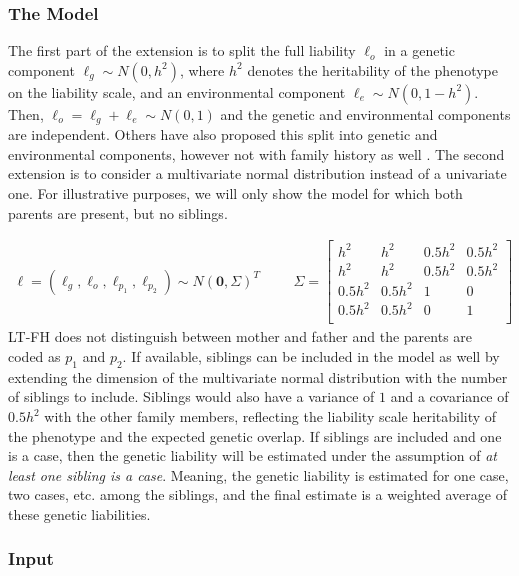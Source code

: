 \subsubsection{The Model}

The first part of the extension is to split the full liability $ \ell_o $ in a genetic component $ \ell_g \sim N(0,h^2) $, where $ h^2 $ denotes the heritability of the phenotype on the liability scale, and an environmental component $ \ell_e \sim N(0, 1-h^2) $. Then, $ \ell_o = \ell_g + \ell_e \sim N(0,1) $ and the genetic and environmental components are independent. Others have also proposed this split into genetic and environmental components, however not with family history as well \cite{weissbrod2015accurate}. The second extension is to consider a multivariate normal distribution instead of a univariate one. For illustrative purposes, we will only show the model for which both parents are present, but no siblings. 

\begin{align}\label{eq:LTFH_model}
\ell = \left( \ell_g, \ell_o, \ell_{p_1}, \ell_{p_2} \right) \sim N(\mathbf{0}, \Sigma)^T & & &\Sigma = \begin{bmatrix}
h^2	&	h^2	&	0.5h^2	&	0.5h^2	\\
h^2 &	h^2 &	0.5h^2	&	0.5h^2	\\
0.5h^2	&	0.5h^2	&	1	&	0	\\
0.5h^2	&	0.5h^2	&	0	&	1	\\
\end{bmatrix}
\end{align}
LT-FH does not distinguish between mother and father and the parents are coded as $ p_1 $ and $ p_2 $. If available, siblings can be included in the model as well by extending the dimension of the multivariate normal distribution with the number of siblings to include. Siblings would also have a variance of $ 1 $ and a covariance of $ 0.5h^2 $ with the other family members, reflecting the liability scale heritability of the phenotype and the expected genetic overlap. If siblings are included and one is a case, then the genetic liability will be estimated under the assumption of \textit{at least one sibling is a case}. Meaning, the genetic liability is estimated for one case, two cases, etc. among the siblings, and the final estimate is a weighted average of these genetic liabilities.

\subsubsection{Input}

